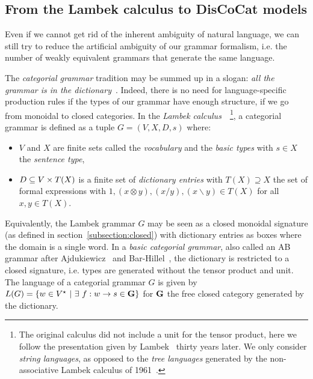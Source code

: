 
\subsection{From the Lambek calculus to DisCoCat models}\label{subsection:lambek-discocat}

Even if we cannot get rid of the inherent ambiguity of natural language, we can still try to reduce the artificial ambiguity of our grammar formalism, i.e. the number of weakly equivalent grammars that generate the same language.

The \emph{categorial grammar} tradition may be summed up in a slogan: \emph{all the grammar is in the dictionary}~\cite{Preller07}.
Indeed, there is no need for language-specific production rules if the types of our grammar have enough structure, if we go from monoidal to closed categories.
In the \emph{Lambek calculus}~\cite{Lambek58}~\footnote
{The original calculus did not include a unit for the tensor product, here we follow the presentation given by Lambek~\cite{Lambek88} thirty years later.
We only consider \emph{string languages}, as opposed to the \emph{tree languages} generated by the non-associative Lambek calculus of 1961~\cite{Lambek61}.}, a categorial grammar is defined as a tuple $G = (V, X, D, s)$ where:
\begin{itemize}
\item $V$ and $X$ are finite sets called the \emph{vocabulary} and the \emph{basic types} with $s \in X$ the \emph{sentence type},
\item $D \subseteq V \times T(X)$ is a finite set of \emph{dictionary entries} with $T(X) \supseteq X$ the set of formal expressions with $1, (x \otimes y), (x / y), (x \backslash y) \in T(X)$ for all $x, y \in T(X)$.
\end{itemize}
Equivalently, the Lambek grammar $G$ may be seen as a closed monoidal signature (as defined in section~\ref{subsection:closed}) with dictionary entries as boxes where the domain is a single word.
In a \emph{basic categorial grammar}, also called an AB grammar after Ajdukiewicz~\cite{Ajdukiewicz35} and Bar-Hillel~\cite{Bar-Hillel54}, the dictionary is restricted to a closed signature, i.e. types are generated without the tensor product and unit.
The language of a categorial grammar $G$ is given by $L(G) = \{ w \in V^\star \ \vert \ \exists \ f : w \to s \in \G \}$ for $\mathbf{G}$ the free closed category generated by the dictionary.

